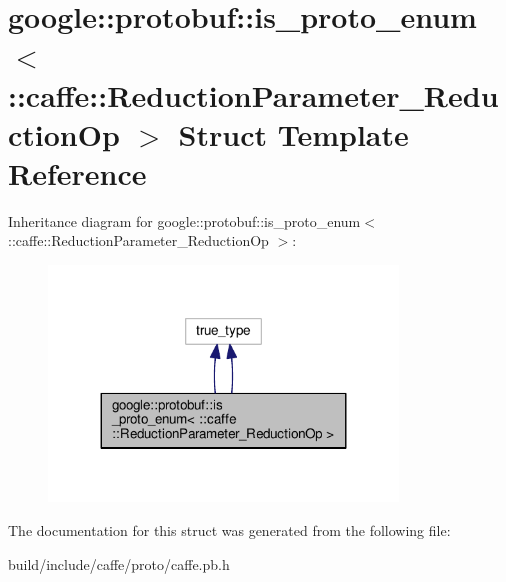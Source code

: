 \hypertarget{structgoogle_1_1protobuf_1_1is__proto__enum_3_01_1_1caffe_1_1_reduction_parameter___reduction_op_01_4}{}\section{google\+:\+:protobuf\+:\+:is\+\_\+proto\+\_\+enum$<$ \+:\+:caffe\+:\+:Reduction\+Parameter\+\_\+\+Reduction\+Op $>$ Struct Template Reference}
\label{structgoogle_1_1protobuf_1_1is__proto__enum_3_01_1_1caffe_1_1_reduction_parameter___reduction_op_01_4}


Inheritance diagram for google\+:\+:protobuf\+:\+:is\+\_\+proto\+\_\+enum$<$ \+:\+:caffe\+:\+:Reduction\+Parameter\+\_\+\+Reduction\+Op $>$\+:
\nopagebreak
\begin{figure}[H]
\begin{center}
\leavevmode
\includegraphics[width=263pt]{structgoogle_1_1protobuf_1_1is__proto__enum_3_01_1_1caffe_1_1_reduction_parameter___reduction_op_01_4__inherit__graph}
\end{center}
\end{figure}


The documentation for this struct was generated from the following file\+:\begin{DoxyCompactItemize}
\item 
build/include/caffe/proto/caffe.\+pb.\+h\end{DoxyCompactItemize}
